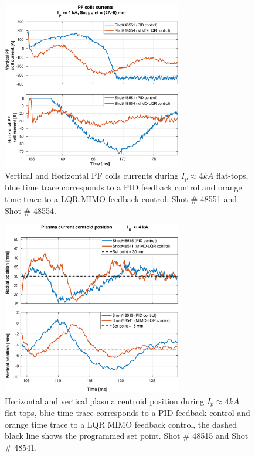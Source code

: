 \begin{figure}
	\centering
	\includegraphics[width=0.7\textwidth]{Chp5/PIDvsMIMO_551_554_curr_2.eps}
	\caption{   Vertical and Horizontal PF coils currents during  $I_p\approx 4kA$  flat-tops, blue time trace corresponds to a PID feedback control and orange time trace to a LQR MIMO feedback control.  Shot $\#$ 48551 and Shot $\#$ 48554.}
\end{figure}
\begin{figure}
	\centering
	\includegraphics[width=0.7\textwidth]{Chp5/PIDvsMIMO_515_541_2.eps}
	\caption{Horizontal and vertical plasma centroid position during  $I_p\approx 4kA$  flat-tops, blue time trace corresponds to a PID feedback control and orange time trace to a LQR MIMO feedback control, the dashed black line shows the programmed set point.  Shot $\#$ 48515 and Shot $\#$ 48541.}
\end{figure}


